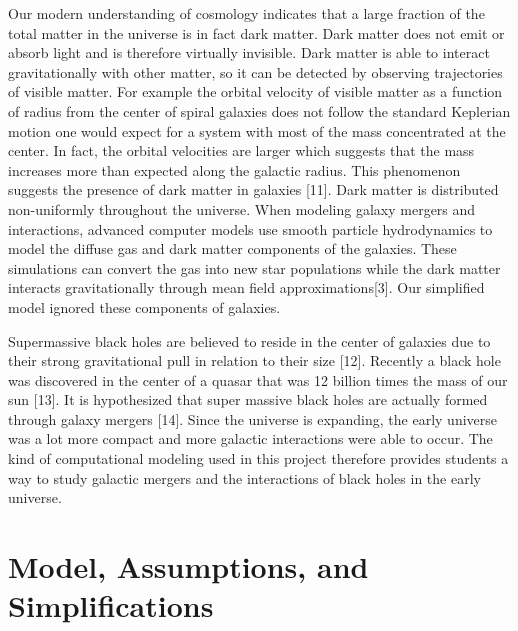 \documentclass[11pt]{article}
\begin{document}
Our modern understanding of cosmology indicates that a large fraction of the total matter in the universe is in fact dark matter.  Dark matter does not emit or absorb light and is therefore virtually invisible.  Dark matter is able to interact gravitationally with other matter, so it can be detected by observing trajectories of visible matter.  For example the orbital velocity of visible matter as a function of radius from the center of spiral galaxies does not follow the standard Keplerian motion one would expect for a system with most of the mass concentrated at the center.  In fact, the orbital velocities are larger which suggests that the mass increases more than expected along the galactic radius.  This phenomenon suggests the presence of dark matter in galaxies [11]. Dark matter is distributed non-uniformly throughout the universe. When modeling galaxy mergers and interactions, advanced computer models use smooth particle hydrodynamics to model the diffuse gas and dark matter components of the galaxies.  These simulations can convert the gas into new star populations while the dark matter interacts gravitationally through mean field approximations[3].  Our simplified model ignored these components of galaxies.

Supermassive black holes are believed to reside in the center of galaxies due to their strong gravitational pull in relation to their size [12].  Recently a black hole was discovered in the center of a quasar that was 12 billion times the mass of our sun [13].  It is hypothesized that super massive black holes are actually formed through galaxy mergers [14].  Since the universe is expanding, the early universe was a lot more compact and more galactic interactions were able to occur. The kind of computational modeling used in this project therefore provides students a way to study galactic mergers and the interactions of black holes in the early universe.  

\section{Model, Assumptions, and Simplifications}	
\end{document}
